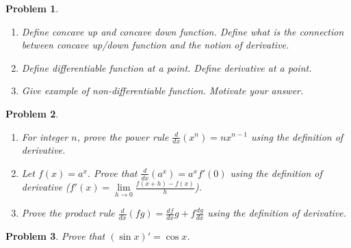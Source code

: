 \documentclass{article}
\newtheorem{problem}{Problem}
\begin{document}
\begin{problem} ~
\begin{enumerate}
\item Define concave up and concave down function. Define what is the connection between concave up/down function and the notion of derivative.
\item Define differentiable function at a point. Define derivative at a point.

\item Give example of non-differentiable function. Motivate your answer.
\end{enumerate}
\end{problem}
\begin{problem}~
\begin{enumerate}
\item For integer $n$, prove the power rule $\frac{d}{dx}(x^n)=n x^{n-1} $ using the definition of derivative.
\item Let $f(x)=a^x$. Prove that $\frac{d}{dx} (a^x) = a^x f'(0)$ using the definition of derivative ($f'(x)=\lim\limits_{h\to 0}\frac{f(x+h)-f(x)}{h}$).
\item Prove the product rule $\frac{d}{dx} (f g)= \frac{df}{dx} g+ f \frac{dg}{dx} $ using the definition of derivative.
\end{enumerate}
\end{problem}
\begin{problem}
Prove that $(\sin x)'=\cos x$.
\end{problem}
\end{document}

